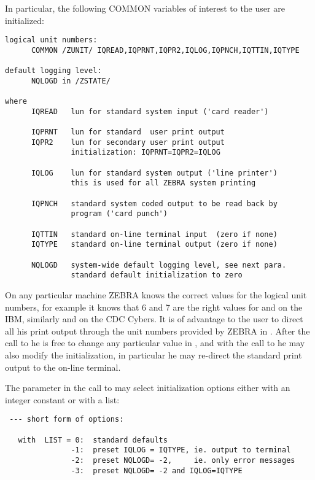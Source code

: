 In particular, the following COMMON variables of interest to
the user are initialized:

\begin{verbatim}
logical unit numbers:
      COMMON /ZUNIT/ IQREAD,IQPRNT,IQPR2,IQLOG,IQPNCH,IQTTIN,IQTYPE

default logging level:
      NQLOGD in /ZSTATE/

where
      IQREAD   lun for standard system input ('card reader')

      IQPRNT   lun for standard  user print output
      IQPR2    lun for secondary user print output
               initialization: IQPRNT=IQPR2=IQLOG

      IQLOG    lun for standard system output ('line printer')
               this is used for all ZEBRA system printing

      IQPNCH   standard system coded output to be read back by
               program ('card punch')

      IQTTIN   standard on-line terminal input  (zero if none)
      IQTYPE   standard on-line terminal output (zero if none)

      NQLOGD   system-wide default logging level, see next para.
               standard default initialization to zero
\end{verbatim} 

On any particular machine ZEBRA knows the correct values for
the logical unit numbers, for example it knows that 6 and 7
are the right values for  and  on the IBM,
similarly   and   on the CDC Cybers.
It is of advantage to the user to direct all his print output
through the unit numbers provided by ZEBRA in .
After the call to  he is free to change any particular
value in , and with the call to  he may also
modify the initialization, in particular he may re-direct
the standard print output to the on-line terminal.

The parameter in the call to  may select initialization
options either with an integer constant or with a list:


\begin{verbatim}
 --- short form of options:

   with  LIST = 0:  standard defaults
               -1:  preset IQLOG = IQTYPE, ie. output to terminal
               -2:  preset NQLOGD= -2,     ie. only error messages
               -3:  preset NQLOGD= -2 and IQLOG=IQTYPE

\end{verbatim}


